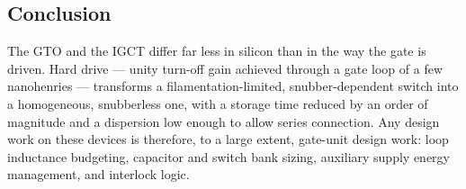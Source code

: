 \subsection{Conclusion}

The GTO and the IGCT differ far less in silicon than in the way the gate is
driven. Hard drive --- unity turn-off gain achieved through a gate loop of a few
nanohenries --- transforms a filamentation-limited, snubber-dependent switch into
a homogeneous, snubberless one, with a storage time reduced by an order of
magnitude and a dispersion low enough to allow series connection. Any design work
on these devices is therefore, to a large extent, gate-unit design work: loop
inductance budgeting, capacitor and switch bank sizing, auxiliary supply energy
management, and interlock logic.


